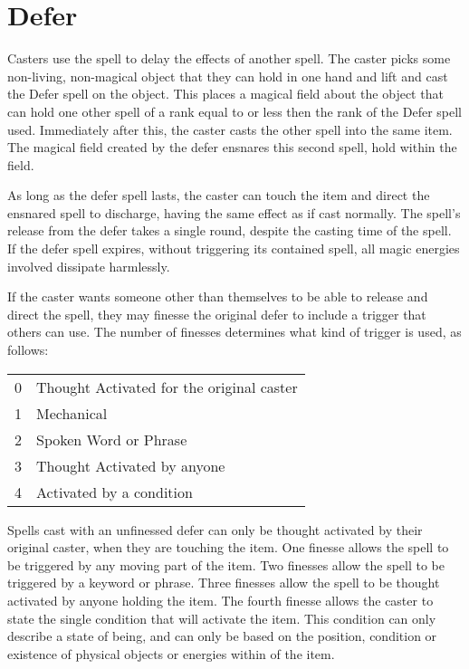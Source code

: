 \section{Defer}


Casters use the  spell to delay the effects of another spell. The caster picks some non-living, non-magical object that they can hold in one hand and lift and cast the Defer spell on the object. This places a magical field about the object that can hold one other spell of a rank equal to or less then the rank of the Defer spell used. Immediately after this, the caster casts the other spell into the same item. The magical field created by the defer ensnares this second spell, hold within the field. 

As long as the defer spell lasts, the caster can touch the item and direct the ensnared spell to discharge, having the same effect as if cast normally. The spell’s release from the defer takes a single round, despite the casting time of the spell. If the defer spell expires, without triggering its contained spell, all magic energies involved dissipate harmlessly.

If the caster wants someone other than themselves to be able to release and direct the spell, they may finesse the original defer to include a trigger that others can use. The number of finesses determines what kind of trigger is used, as follows:

\begin{tabular}{@{} l l}
0 & Thought Activated for the original caster\\
1 & Mechanical\\
2 & Spoken Word or Phrase\\
3 & Thought Activated by anyone\\
4 & Activated by a condition
\end{tabular}

Spells cast with an unfinessed defer can only be thought activated by their original caster, when they are touching the item. One finesse allows the spell to be triggered by any moving part of the item. Two finesses allow the spell to be triggered by a keyword or phrase. Three finesses allow the spell to be thought activated by anyone holding the item. The fourth finesse allows the caster to state the single condition that will activate the item. This condition can only describe a state of being, and can only be based on the position, condition or existence of physical objects or energies within  of the item.

